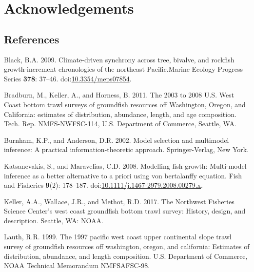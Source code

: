 \documentclass[
]{article}
\newlength{\cslhangindent}
\newlength{\cslentryspacingunit} %
\newenvironment{CSLReferences}[2] %
 {%
  \setlength{\parindent}{0pt}
  \ifodd #1
  \let\oldpar\par
  \def\par{\hangindent=\cslhangindent\oldpar}
  \fi
  \setlength{\parskip}{#2\cslentryspacingunit}
 }%
 {}
\newcommand{\meps}{Marine Ecology Progress Series\xspace}
\begin{document}
\hypertarget{acknowledgements}{%
\section*{Acknowledgements}\label{acknowledgements}}

\pagebreak

\hypertarget{references}{%
\subsection*{References}\label{references}}

\hypertarget{refs}{}
\begin{CSLReferences}{1}{0}
\leavevmode{}%
Black, B.A. 2009. {Climate-driven synchrony across tree, bivalve, and
rockfish growth-increment chronologies of the northeast Pacific}.\meps
\textbf{378}: 37--46.
doi:\href{https://doi.org/10.3354/meps07854}{10.3354/meps07854}.

\leavevmode{}%
Bradburn, M., Keller, A., and Horness, B. 2011. {The 2003 to 2008 U.S.
West Coast bottom trawl surveys of groundfish resources off Washington,
Oregon, and California: estimates of distribution, abundance, length,
and age composition}. {Tech. Rep. NMFS-NWFSC-114, U.S. Department of
Commerce, Seattle, WA}.

\leavevmode{}%
Burnham, K.P., and Anderson, D.R. 2002. Model selection and multimodel
inference: A practical information-theoretic approach. Springer-Verlag,
New York.

\leavevmode{}%
Katsanevakis, S., and Maravelias, C.D. 2008. Modelling fish growth:
Multi-model inference as a better alternative to a priori using von
bertalanffy equation. Fish and Fisheries \textbf{9}(2): 178--187.
doi:\href{https://doi.org/10.1111/j.1467-2979.2008.00279.x}{10.1111/j.1467-2979.2008.00279.x}.

\leavevmode{}%
Keller, A.A., Wallace, J.R., and Methot, R.D. 2017. The {Northwest
Fisheries Science Center's} west coast groundfish bottom trawl survey:
History, design, and description. Seattle, WA: NOAA.

\leavevmode{}%
Lauth, R.R. 1999. The 1997 pacific west coast upper continental slope
trawl survey of groundfish resources off washington, oregon, and
california: Estimates of distribution, abundance, and length
composition. {U.S. Department of Commerce, NOAA Technical Memorandum
NMFSAFSC-98}.


\end{CSLReferences}
\end{document}
